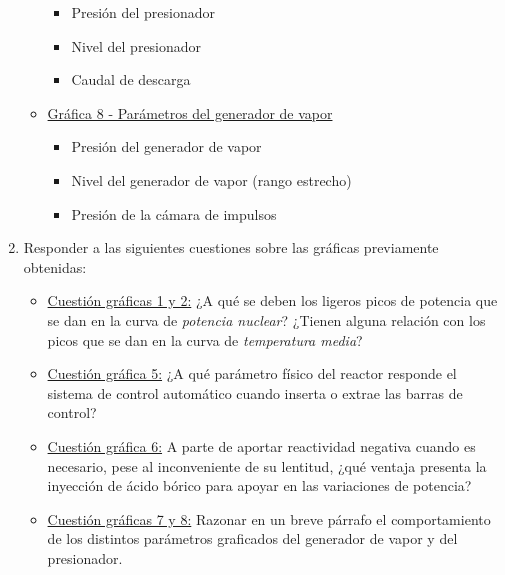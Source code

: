 \begin{enumerate}
\begin{itemize}
      \begin{itemize}
        \item Presión del presionador
        \item Nivel del presionador 
        \item Caudal de descarga
      \end{itemize}
      \item \underline{Gráfica 8 - Parámetros del generador de vapor}
      \begin{itemize}
        \item Presión del generador de vapor
        \item Nivel del generador de vapor (rango estrecho)
        \item Presión de la cámara de impulsos
      \end{itemize}
    \end{itemize}
  
  \item Responder a las siguientes cuestiones sobre las gráficas previamente obtenidas:
  \begin{itemize}
    \item \underline{Cuestión gráficas 1 y 2:} ¿A qué se deben los ligeros picos de potencia que se dan en la curva de \textit{potencia nuclear}? ¿Tienen alguna relación con los picos que se dan en la curva de \textit{temperatura media}?
    \item \underline{Cuestión gráfica 5:} ¿A qué parámetro físico del reactor responde el sistema de control automático cuando inserta o extrae las barras de control?
    \item \underline{Cuestión gráfica 6:} A parte de aportar reactividad negativa cuando es necesario, pese al inconveniente de su lentitud, ¿qué ventaja presenta la inyección de ácido bórico para apoyar en las variaciones de potencia?
    \item \underline{Cuestión gráficas 7 y 8:} Razonar en un breve párrafo el comportamiento de los distintos parámetros graficados del generador de vapor y del presionador.
  \end{itemize}


\end{enumerate}
